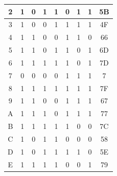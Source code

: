\documentclass{templateNote}
\begin{document}
\begin{enumerate}
\begin{table}[H]
\begin{tabular}{|c|c|c|c|c|c|c|c|c|}
            2            & 1              & 0              & 1              & 1              & 0              & 1              & 1              & 5B         \\ \hline
            3            & 1              & 0              & 0              & 1              & 1              & 1              & 1              & 4F         \\ \hline
            4            & 1              & 1              & 0              & 0              & 1              & 1              & 0              & 66         \\ \hline
            5            & 1              & 1              & 0              & 1              & 1              & 0              & 1              & 6D         \\ \hline
            6            & 1              & 1              & 1              & 1              & 1              & 0              & 1              & 7D         \\ \hline
            7            & 0              & 0              & 0              & 0              & 1              & 1              & 1              & 7          \\ \hline
            8            & 1              & 1              & 1              & 1              & 1              & 1              & 1              & 7F         \\ \hline
            9            & 1              & 1              & 0              & 0              & 1              & 1              & 1              & 67         \\ \hline
            A            & 1              & 1              & 1              & 0              & 1              & 1              & 1              & 77         \\ \hline
            B            & 1              & 1              & 1              & 1              & 1              & 0              & 0              & 7C         \\ \hline
            C            & 1              & 0              & 1              & 1              & 0              & 0              & 0              & 58         \\ \hline
            D            & 1              & 0              & 1              & 1              & 1              & 1              & 0              & 5E         \\ \hline
            E            & 1              & 1              & 1              & 1              & 0              & 0              & 1              & 79         \\ \hline

\end{tabular}
\end{table}
\end{enumerate}
\end{document}
